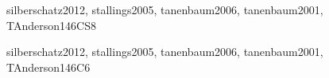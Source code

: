 \begin{syllabus}
\begin{unit}{\OSVirtualMachines}{}{silberschatz2012, stallings2005, tanenbaum2006, tanenbaum2001, TAnderson14}{6}{CS8}
\begin{topics}
      \item \OSVirtualMachinesTopicTypes
      \item \OSVirtualMachinesTopicPaging
      \item \OSVirtualMachinesTopicVirtual
      \item \OSVirtualMachinesTopicHypervisors
      \item \OSVirtualMachinesTopicPortable
      \item \OSVirtualMachinesTopicCost
\end{topics}
\begin{learningoutcomes}
	\item \OSVirtualMachinesLOExplainTheVirtual [\Familiarity]
	\item \OSVirtualMachinesLODifferentiateEmulation [\Familiarity]
	\item \OSVirtualMachinesLOEvaluateVirtualization [\Assessment]
	\item \OSVirtualMachinesLODiscussHypervisors [\Familiarity]
\end{learningoutcomes}
\end{unit}

\begin{unit}{\OSDeviceManagement}{}{silberschatz2012, stallings2005, tanenbaum2006, tanenbaum2001, TAnderson14}{6}{C6}
\begin{topics}
      \item \OSDeviceManagementTopicCharacteristics
      \item \OSDeviceManagementTopicAbstracting
      \item \OSDeviceManagementTopicBuffering
      \item \OSDeviceManagementTopicDirect
      \item \OSDeviceManagementTopicRecovery
\end{topics}
\begin{learningoutcomes}
	\item \OSDeviceManagementLOExplainTheBetween [\Familiarity]
	\item \OSDeviceManagementLOIdentifyTheThe [\Familiarity]
	\item \OSDeviceManagementLOExplainBuffering [\Familiarity]
	\item \OSDeviceManagementLODifferentiateThe [\Familiarity]
	\item \OSDeviceManagementLODescribeTheDisadvantagesMemory [\Familiarity]
	\item \OSDeviceManagementLOIdentifyTheFailure [\Familiarity]
	\item \OSDeviceManagementLOImplementADriver [\Usage]
\end{learningoutcomes}
\end{unit}


\end{syllabus}
